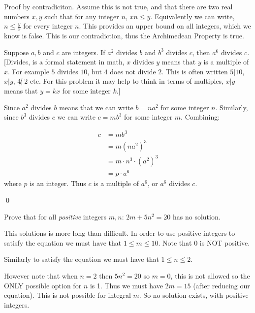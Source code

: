 \documentclass[addpoints]{exam}
\begin{document}
\begin{questions}
  \begin{solution}
    Proof by contradiciton. Assume this is not true, and that there are two real
    numbers $x,y$ such that for any integer $n$, $xn \leq y$. Equivalently we
    can write, $n \leq \frac{y}{x}$ for every integer $n$. This provides an
    upper bound on all integers, which we know is false. This is our
    contradiction, thus the Archimedean Property is true.
  \end{solution}

  \question[6] Suppose $a,b$ and $c$ are integers. If $a^2$ divides $b$ and
  $b^3$ divides $c$, then $a^6$ divides $c$. [Divides, is a formal statement in
  math, $x$ divides $y$ means that $y$ is a multiple of $x$. For example $5$
  divides $10$, but $4$ does not divide $2$. This is often written $5|10$,
  $x|y$, $4\not|\ 2$ etc. For this problem it may help to think in terms of
  multiples, $x|y$ means that $y= kx$ for some integer $k$.]

  \begin{solution}
    Since $a^2$ divides $b$ means that we can write $b = na^2$ for some integer
    $n$. Similarly, since $b^3$ divides $c$ we can write $c = mb^3$ for some
    integer $m$. Combining:

    \begin{align*}
      c &= mb^3\\
      &= m(na^2)^3\\
      &= m\cdot n^3 \cdot (a^2)^3\\
      &= p \cdot a^6
    \end{align*}
    where $p$ is an integer. Thus $c$ is a multiple of $a^6$, or $a^6$ divides
    $c$.
    
    \qed
  \end{solution}

  \question[7] Prove that for all \emph{positive} integers $m,n$: $2m + 5n^2 = 20$ has no solution.
  \vspace*{\fill}
  \begin{solution}
    This solutions is more long than difficult. In order to use positive integers to satisfy the equation we must have that $1\leq m \leq 10$. Note that 0 is NOT positive.

    Similarly to satisfy the equation we must have that $1 \leq n \leq 2$. 

    However note that when $n=2$ then $5n^2 = 20$ so $m =0$, this is not allowed so the ONLY possible option for $n$ is 1. Thus we must have $2m = 15$ (after reducing our equation). This is not possible for integral $m$. So no solution exists, with positive integers.


\end{solution}
\end{questions}
\end{document}
